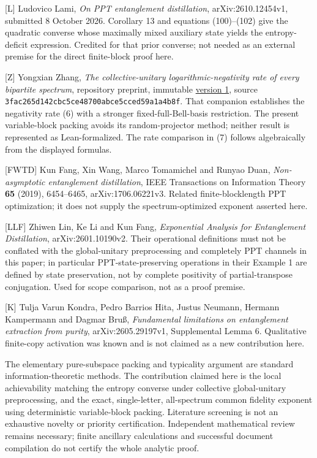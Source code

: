 \documentclass[11pt]{article}
\begin{document}
{[}L{]} Ludovico Lami, \emph{On PPT entanglement distillation}, arXiv:2610.12454v1, submitted 8 October 2026. Corollary 13 and equations (100)--(102) give the quadratic converse whose maximally mixed auxiliary state yields the entropy-deficit expression. Credited for that prior converse; not needed as an external premise for the direct finite-block proof here.

{[}Z{]} Yongxian Zhang, \emph{The collective-unitary logarithmic-negativity rate of every bipartite spectrum}, repository preprint, immutable \href{https://github.com/mxym/math/releases/tag/collective-unitary-negativity-rate-preprint-v1}{version 1}, source \texttt{3fac265d142cbc5ce48700abce5cced59a1a4b8f}. That companion establishes the negativity rate (6) with a stronger fixed-full-Bell-basis restriction. The present variable-block packing avoids its random-projector method; neither result is represented as Lean-formalized. The rate comparison in (7) follows algebraically from the displayed formulas.

{[}FWTD{]} Kun Fang, Xin Wang, Marco Tomamichel and Runyao Duan, \emph{Non-asymptotic entanglement distillation}, IEEE Transactions on Information Theory \textbf{65} (2019), 6454--6465, arXiv:1706.06221v3. Related finite-blocklength PPT optimization; it does not supply the spectrum-optimized exponent asserted here.

{[}LLF{]} Zhiwen Lin, Ke Li and Kun Fang, \emph{Exponential Analysis for Entanglement Distillation}, arXiv:2601.10190v2. Their operational definitions must not be conflated with the global-unitary preprocessing and completely PPT channels in this paper; in particular PPT-state-preserving operations in their Example 1 are defined by state preservation, not by complete positivity of partial-transpose conjugation. Used for scope comparison, not as a proof premise.

{[}K{]} Tulja Varun Kondra, Pedro Barrios Hita, Justus Neumann, Hermann Kampermann and Dagmar Bruß, \emph{Fundamental limitations on entanglement extraction from purity}, arXiv:2605.29197v1, Supplemental Lemma 6. Qualitative finite-copy activation was known and is not claimed as a new contribution here.

The elementary pure-subspace packing and typicality argument are standard information-theoretic methods. The contribution claimed here is the local achievability matching the entropy converse under collective global-unitary preprocessing, and the exact, single-letter, all-spectrum common fidelity exponent using deterministic variable-block packing. Literature screening is not an exhaustive novelty or priority certification. Independent mathematical review remains necessary; finite ancillary calculations and successful document compilation do not certify the whole analytic proof.
\end{document}
